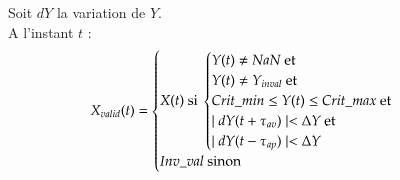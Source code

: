 
Soit $dY$ la variation de $Y$.\\
A l'instant $t$ :
\[
X_{valid}(t) = 
\begin{cases} 
X(t) \text{ si }
\begin{cases}
Y(t) \ne NaN \text{ et } \\
Y(t) \ne Y_{inval} \text{ et } \\
Crit\_min \le Y(t) \le Crit\_max  \text{ et } \\
\mid dY(t+\tau_{av})\mid < \Delta Y   \text{ et } \\
\mid dY(t-\tau_{ap}) \mid < \Delta Y  \\
\end{cases} \\
Inv\_val \text{ sinon }\\
\end{cases} \\
\]
